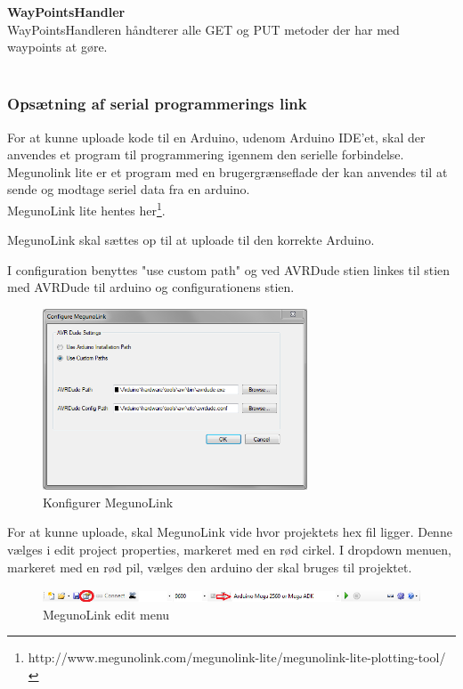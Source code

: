 \textbf{WayPointsHandler}\\
WayPointsHandleren håndterer alle GET og PUT metoder der har med waypoints at gøre. \\ \\

\newpage

\subsubsection*{Opsætning af serial programmerings link}

For at kunne uploade kode til en Arduino, udenom Arduino IDE'et, skal der anvendes et program til programmering igennem den serielle forbindelse.
Megunolink lite er et program med en brugergrænseflade der kan anvendes til at sende og modtage seriel data fra en arduino.\\
MegunoLink lite hentes her\footnote{http://www.megunolink.com/megunolink-lite/megunolink-lite-plotting-tool/}.

MegunoLink skal sættes op til at uploade til den korrekte Arduino. 

I configuration benyttes "use custom path" og ved AVRDude stien linkes til stien med AVRDude til arduino og configurationens stien. 

\begin{figure}[H]
	\centering
	\includegraphics[width=0.7\textwidth]{Billeder/implementation/Howtoguide/megunolink_config.png}
	\caption{Konfigurer MegunoLink}
	\label{fig:Konfigurer_MegunoLink}
\end{figure}

For at kunne uploade, skal MegunoLink vide hvor projektets hex fil ligger. Denne vælges i edit project properties, markeret med en rød cirkel.
I dropdown menuen, markeret med en rød pil, vælges den arduino der skal bruges til projektet.

\begin{figure}[H]
	\centering
	\includegraphics[width=1\textwidth]{Billeder/implementation/Howtoguide/meguno_bar.png}
	\caption{MegunoLink edit menu}
	\label{fig:MegunoLink}
\end{figure}






